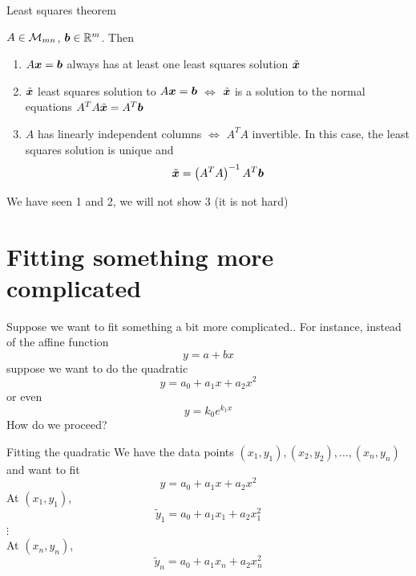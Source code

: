\documentclass[aspectratio=169]{beamer}
\begin{document}
\begin{frame}{Least squares theorem}
\begin{importanttheorem}\label{th:least_squares}
$A\in\mathcal{M}_{mn}$, $\bm{b}\in\mathbb{R}^m$. Then
\begin{enumerate}
\item $A\bm{x}=\bm{b}$ always has at least one least squares solution $\tilde{\bm{x}}$
\item $\tilde{\bm{x}}$ least squares solution to $A\bm{x}=\bm{b}$ $\iff$ $\tilde{\bm{x}}$ is a solution to the normal equations $A^TA\tilde{\bm{x}} = A^T\bm{b}$
\item $A$ has linearly independent columns $\iff$ $A^TA$ invertible.  
\newline In this case, the least squares solution is unique and 
\[
\tilde{\bm{x}} = \left(A^TA\right)^{-1}A^T\bm{b}
\]
\end{enumerate}
\end{importanttheorem}
\vfill
We have seen 1 and 2, we will not show 3 (it is not hard)
\end{frame}


\section{Fitting something more complicated}

\begin{frame}{Suppose we want to fit something a bit more complicated..}
For instance, instead of the affine function
\[
y = a+bx
\]
suppose we want to do the quadratic
\[
y = a_0+a_1x+a_2x^2
\]
or even
\[
y = k_0 e^{k_1x}
\]
\vfill
How do we proceed?
\end{frame}


\begin{frame}{Fitting the quadratic}
We have the data points $(x_1,y_1),(x_2,y_2),\ldots,(x_n,y_n)$ and want to fit
\[
y = a_0+a_1x+a_2x^2
\]
At $(x_1,y_1)$,
\[
\tilde y_1 = a_0+a_1x_1+a_2x_1^2
\]
$\vdots$\\
At $(x_n,y_n)$,
\[
\tilde y_n = a_0+a_1x_n+a_2x_n^2
\]
\end{frame}
\end{document}
